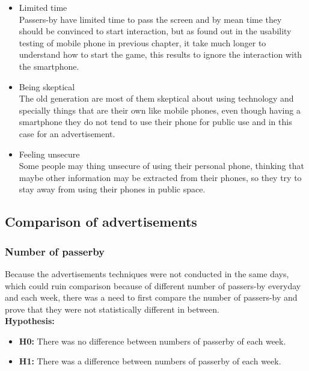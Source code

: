 \begin{enumerate}
\begin{itemize}
\item Limited time \\
Passers-by have limited time to pass the screen and by mean time they should be convinced to start interaction, but as found out in the usability testing of mobile phone in previous chapter, it take much longer to understand how to start the game, this results to ignore the interaction with the smartphone. 

\item Being skeptical \\
The old generation are most of them skeptical about using technology and specially things that are their own like mobile phones, even though having a smartphone they do not tend to use their phone for public use and in this case for an advertisement. 

\item Feeling unsecure \\
Some people may thing unsecure of using their personal phone, thinking that maybe other information may be extracted from their phones, so they try to stay away from using their phones in public space. 


\end{itemize}




\end{enumerate}


\newpage
\subsection{Comparison of advertisements}

\subsubsection {Number of passerby}
Because the advertisements techniques were not conducted in the same days, which could ruin comparison because of different number of passers-by everyday and each week, there was a need to first compare the number of passers-by and prove that they were not statistically different in between. \\

\textbf{Hypothesis: }
\begin{itemize}
\item \textbf{H0:} There was no difference between numbers of passerby of each week.
\item \textbf{H1:} There was a difference between numbers of passerby of each week.
\end{itemize}

